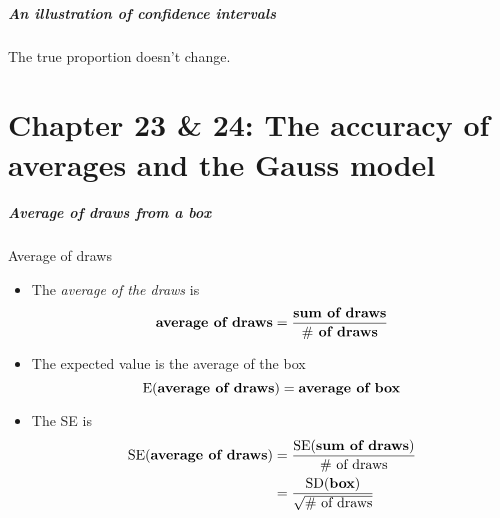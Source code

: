 \documentclass[handout]{beamer}
\begin{document}
   \begin{frame}
   \frametitle{An illustration of confidence intervals}
   \begin{center}
   \end{center}
   The {\color{blue} true proportion} doesn't change.
   \end{frame}

   \part{Chapter 23 \& 24: The accuracy of averages and the Gauss model}
   \frame{\partpage}


   \begin{frame} \frametitle{Average of draws from a box}

   \begin{block}
   {Average of draws}
   \begin{itemize}
   \item The {\em average of the draws} is
   $$
   \text{\bf average of draws} = \frac{\text{\bf sum of draws}}{\text{{\bf $\#$ of draws}}}
   $$
   \item The expected value is the average of the box
   $$
   \text{E({\bf average of draws})} = \text{\bf average of box}
   $$

   \item The SE is
   $$
   \begin{aligned}
      \text{SE({\bf average of draws})} &= \frac{\text{SE({\bf sum of draws})}}{\text{$\#$ of draws}}      \\
      &= \frac{\text{SD({\bf box})}}{\sqrt{\text{$\#$ of draws}}}      \\
   \end{aligned}
   $$
   \end{itemize}
   \end{block}
   \end{frame}
\end{document}
